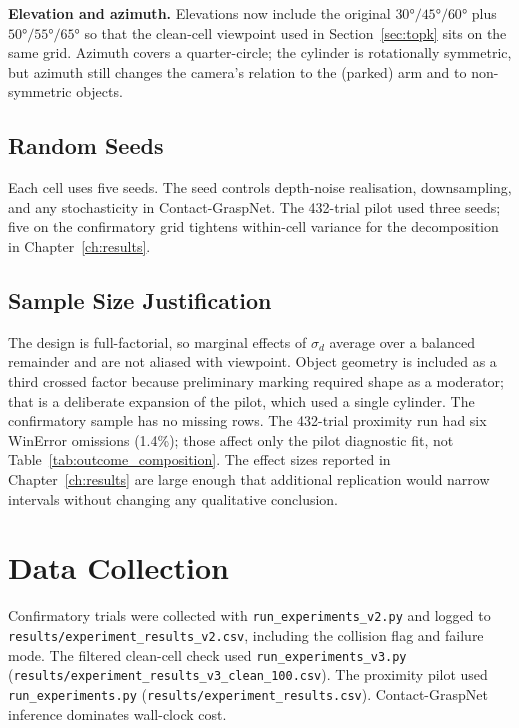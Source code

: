 \documentclass[11pt,a4paper]{report}
\begin{document}
\textbf{Elevation and azimuth.} Elevations now include the original $30°/45°/60°$ plus $50°/55°/65°$ so that the clean-cell viewpoint used in Section~\ref{sec:topk} sits on the same grid. Azimuth covers a quarter-circle; the cylinder is rotationally symmetric, but azimuth still changes the camera's relation to the (parked) arm and to non-symmetric objects.

\subsection{Random Seeds}

Each cell uses five seeds. The seed controls depth-noise realisation, downsampling, and any stochasticity in Contact-GraspNet. The 432-trial pilot used three seeds; five on the confirmatory grid tightens within-cell variance for the decomposition in Chapter~\ref{ch:results}.

\subsection{Sample Size Justification}
\label{sec:sample_size}

The design is full-factorial, so marginal effects of $\sigma_d$ average over a balanced remainder and are not aliased with viewpoint. Object geometry is included as a third crossed factor because preliminary marking required shape as a moderator; that is a deliberate expansion of the pilot, which used a single cylinder. The confirmatory sample has no missing rows. The 432-trial proximity run had six WinError omissions (1.4\%); those affect only the pilot diagnostic fit, not Table~\ref{tab:outcome_composition}. The effect sizes reported in Chapter~\ref{ch:results} are large enough that additional replication would narrow intervals without changing any qualitative conclusion.

\section{Data Collection}
\label{sec:data_collection}

Confirmatory trials were collected with \texttt{run\_experiments\_v2.py} and logged to \texttt{results/experiment\_results\_v2.csv}, including the collision flag and failure mode. The filtered clean-cell check used \texttt{run\_experiments\_v3.py} (\texttt{results/experiment\_results\_v3\_clean\_100.csv}). The proximity pilot used \texttt{run\_experiments.py} (\texttt{results/experiment\_results.csv}). Contact-GraspNet inference dominates wall-clock cost.
\end{document}
